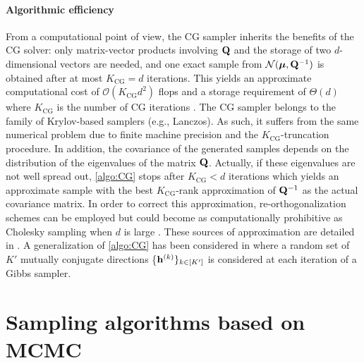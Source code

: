 \documentclass[nohypdvips,onefignum,onetabnum]{siamart171218}
\begin{document}
\paragraph{Algorithmic efficiency}
From a computational point of view, the CG sampler inherits the benefits of the CG solver: only matrix-vector products involving $\mathbf{Q}$ and the storage of two $d$-dimensional vectors are needed, and one exact sample from $\mathcal{N}(\boldsymbol{\mu},\mathbf{Q}^{-1})$ is obtained after at most $K_{\mathrm{CG}} = d$ iterations.
This yields an approximate computational cost of $\mathcal{O}(K_{\mathrm{CG}}d^2)$ flops and a storage requirement of $\Theta(d)$ where $K_{\mathrm{CG}}$ is the number of CG iterations \cite{HestenesStiefel1952}.
The CG sampler belongs to the family of Krylov-based samplers (e.g., Lanczos). As such, it suffers from the same numerical problem due to finite machine precision and the $K_{\mathrm{CG}}$-truncation procedure.
In addition, the covariance of the generated samples depends on the distribution of the eigenvalues of the matrix $\mathbf{Q}$.
Actually, if these eigenvalues are not well spread out, \cref{algo:CG} stops after $K_{\mathrm{CG}} < d$ iterations which yields an approximate sample with the best $K_{\mathrm{CG}}$-rank approximation of $\mathbf{Q}^{-1}$ as the actual covariance matrix.
In order to correct this approximation, re-orthogonalization schemes can be employed but could become as computationally prohibitive as Cholesky sampling when $d$ is large \cite{Schneider2003}.
These sources of approximation are detailed in \cite{Parker2012}.
A generalization of \cref{algo:CG} has been considered in \cite{Feron2016} where a random set of $K'$ mutually conjugate directions \{$\mathbf{h}^{(k)}\}_{k \in [K']}$ is considered at each iteration of a Gibbs sampler.

\section{Sampling algorithms based on MCMC}
\label{sec:PIGauss_M_nonzero}
\end{document}
